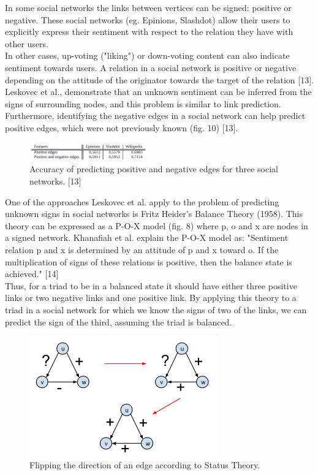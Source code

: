 \documentclass[conference,letterpaper]{IEEEtran}
\begin{document}
In some social networks the links between vertices can be signed: positive or negative. These social networks (eg. Epinions, Slashdot) allow their users to explicitly express their sentiment with respect to the relation they have with other users.\\
In other cases, up-voting ("liking") or down-voting content can also indicate sentiment towards users. A relation in a social network is positive or negative depending on the attitude of the originator towards the target of the relation [13]. Leskovec et al., demonstrate that an unknown sentiment can be inferred from the signs of surrounding nodes, and this problem is similar to link prediction.
Furthermore, identifying the negative edges in a social network can help predict positive edges, which were not previously known (fig. 10) [13]. \\

\begin{center}
\begin{figure}[hb]
\centering
\includegraphics[width=2.0in]{predicting_positive}
\caption{
Accuracy of predicting positive and negative edges for three social networks. [13]
}
\label{fig_sim}
\end{figure}
\end{center}

One of the approaches Leskovec et al. apply to the problem of predicting unknown signs in social networks is Fritz Heider's Balance Theory (1958). This theory can be expressed as a P-O-X model (fig. 8) where p, o and x are nodes in a signed network. Khanafiah et al. explain the P-O-X model as: "Sentiment relation p and x is determined by an attitude of p and x toward o. If the multiplication of signs of these relations is positive, then the balance state is achieved." [14] \\
Thus, for a triad to be in a balanced state it should have either three positive links or two negative links and one positive link. By applying this theory to a triad in a social network for which we know the signs of two of the links, we can predict the sign of the third, assuming the triad is balanced.\\

\begin{center}
\begin{figure}[hb]
\centering
\includegraphics[width=3.2in]{status_theory}
\caption{
Flipping the direction of an edge according to Status Theory.
}
\label{fig_sim}
\end{figure}
\end{center}
\end{document}

